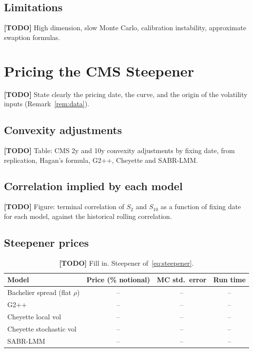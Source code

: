 \documentclass[11pt,a4paper]{article}
\theoremstyle{plain}
\theoremstyle{definition}
\newcommand{\todo}[1]{\textcolor{red!70!black}{\textbf{[TODO]} #1}}
\begin{document}
\subsection{Limitations}
\todo{High dimension, slow Monte Carlo, calibration instability, approximate swaption formulas.}

\clearpage
\section{Pricing the CMS Steepener}
\label{sec:numerics}
\todo{State clearly the pricing date, the curve, and the origin of the volatility inputs (Remark~\ref{rem:data}).}

\subsection{Convexity adjustments}
\todo{Table: CMS 2y and 10y convexity adjustments by fixing date, from replication, Hagan's formula, G2++, Cheyette and SABR-LMM.}

\subsection{Correlation implied by each model}
\todo{Figure: terminal correlation of $S_2$ and $S_{10}$ as a function of fixing date for each model, against the historical rolling correlation.}

\subsection{Steepener prices}
\begin{table}[htbp]
\centering
\begin{tabular}{@{}lccc@{}}
\toprule
Model & Price (\% notional) & MC std.\ error & Run time \\
\midrule
Bachelier spread (flat $\rho$) & -- & -- & -- \\
G2++ & -- & -- & -- \\
Cheyette local vol & -- & -- & -- \\
Cheyette stochastic vol & -- & -- & -- \\
SABR-LMM & -- & -- & -- \\
\bottomrule
\end{tabular}
\caption{\todo{Fill in.} Steepener of~\eqref{eq:steepener}.}
\label{tab:prices}
\end{table}
\end{document}
